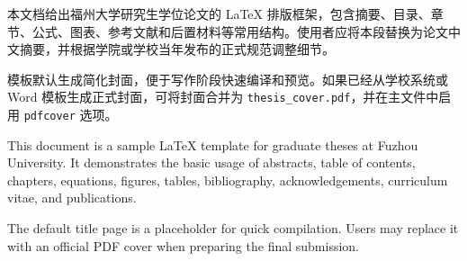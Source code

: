 \begin{abstractCN}
本文档给出福州大学研究生学位论文的 \LaTeX{} 排版框架，包含摘要、目录、章节、公式、图表、参考文献和后置材料等常用结构。使用者应将本段替换为论文中文摘要，并根据学院或学校当年发布的正式规范调整细节。

模板默认生成简化封面，便于写作阶段快速编译和预览。如果已经从学校系统或 Word 模板生成正式封面，可将封面合并为 \texttt{thesis\_cover.pdf}，并在主文件中启用 \texttt{pdfcover} 选项。
\end{abstractCN}


\begin{abstractEN}
This document is a sample \LaTeX{} template for graduate theses at Fuzhou University. It demonstrates the basic usage of abstracts, table of contents, chapters, equations, figures, tables, bibliography, acknowledgements, curriculum vitae, and publications.

The default title page is a placeholder for quick compilation. Users may replace it with an official PDF cover when preparing the final submission.
\end{abstractEN}

